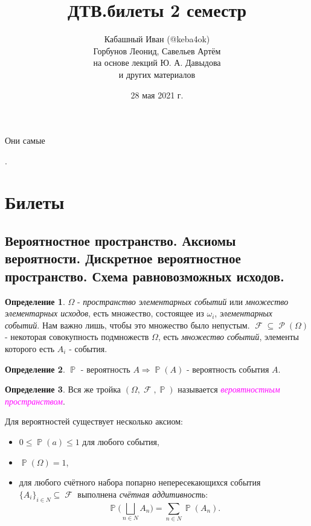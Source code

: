 \documentclass[a4paper,100pt]{article}
\title{ДТВ.билеты 2 семестр}
\author{Кабашный Иван (@keba4ok) \\ Горбунов Леонид, Савельев Артём \\ на основе лекций Ю. А. Давыдова \\ и других материалов}
\date{28 мая 2021 г.}
\theoremstyle{indented}
\theoremstyle{definition}
\newtheorem{defn}{Определение}
\theoremstyle{remark}
\DeclareMathOperator{\PP}{\mathbb{P}}
\DeclareMathOperator{\FF}{\mathcal{F}}
\DeclareMathOperator{\Rho}{\mathcal{P}}
\begin{document}
\newcommand{\resetexlcounters}{%
  \setcounter{exl}{0}%
} 

\newcommand{\resetremarkcounters}{%
  \setcounter{remark}{0}%
} 

\newcommand{\reseconscounters}{%
  \setcounter{cons}{0}%
} 

\newcommand{\resetall}{%
    \resetexlcounters
    \resetremarkcounters
    \reseconscounters%
}

\maketitle 

\newpage

\hypertarget{t1}{Они самые}. 
\tableofcontents

\newpage

\section{Билеты}

\subsection{Вероятностное пространство. Аксиомы вероятности. Дискретное вероятностное пространство. Схема равновозможных исходов.}

\begin{defn}
  $\Omega$ - \textit{пространство элементарных событий} или \textit{множество элементарных исходов}, есть множество, состоящее из $\omega_i$, \textit{элементарных событий}. Нам важно лишь, чтобы это множество было непустым. $\FF\subseteq \Rho(\Omega)$ - некоторая совокупность подмножеств $\Omega$, есть \textit{множество событий}, элементы которого есть $A_i$ - события.
\end{defn}

\begin{defn}
  $\PP$ - вероятность $A\Rightarrow \PP(A)$ - вероятность события $A$.
\end{defn}

\begin{defn}
  Вся же тройка $(\Omega, \FF, \PP)$ называется \hypertarget{n1}{\textcolor{magenta}{\textit{вероятностным пространством}}}.
\end{defn}

Для вероятностей существует несколько аксиом: 

\begin{itemize}
  \item $0\leq \PP(a)\leq 1$ для любого события, 
  \item $\PP(\Omega)=1$, 
  \item для любого счётного набора попарно непересекающихся события $\{A_i\}_{i\in N}\subseteq\FF$ выполнена \textit{счётная аддитивность}:
  \[
      \PP\biggl( \bigsqcup_{n\in N} A_n\biggr)=\sum_{n\in N}\PP(A_n).
  \]
\end{itemize}
\end{document}
